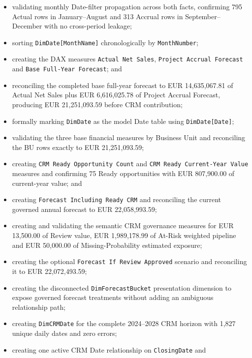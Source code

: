\documentclass[11pt,a4paper]{article}
\begin{document}
\begin{itemize}[leftmargin=7mm,itemsep=3pt]
    \texttt{DimDate[Date]} to \texttt{Fact\_ActualSales[MonthStart]} and
    \texttt{Fact\_ProjectAccrual[ForecastMonth]}; and
    \item validating monthly Date-filter propagation across both facts, confirming
    795 Actual rows in January--August and 313 Accrual rows in
    September--December with no cross-period leakage;
    \item sorting \texttt{DimDate[MonthName]} chronologically by
    \texttt{MonthNumber};
    \item creating the DAX measures \texttt{Actual Net Sales},
    \texttt{Project Accrual Forecast} and \texttt{Base Full-Year Forecast}; and
    \item reconciling the completed base full-year forecast to
    EUR 14,635,067.81 of Actual Net Sales plus EUR 6,616,025.78 of Project
    Accrual Forecast, producing EUR 21,251,093.59 before CRM contribution;
    \item formally marking \texttt{DimDate} as the model Date table using
    \texttt{DimDate[Date]};
    \item validating the three base financial measures by Business Unit and
    reconciling the BU rows exactly to EUR 21,251,093.59;
    \item creating \texttt{CRM Ready Opportunity Count} and
    \texttt{CRM Ready Current-Year Value} measures and confirming 75 Ready
    opportunities with EUR 807,900.00 of current-year value; and
    \item creating \texttt{Forecast Including Ready CRM} and reconciling the
    current governed annual forecast to EUR 22,058,993.59;
    \item creating and validating the semantic CRM governance measures for
    EUR 13,500.00 of Review value, EUR 1,989,178.99 of At-Risk weighted pipeline
    and EUR 50,000.00 of Missing-Probability estimated exposure;
    \item creating the optional \texttt{Forecast If Review Approved} scenario and
    reconciling it to EUR 22,072,493.59;
    \item creating the disconnected \texttt{DimForecastBucket} presentation
    dimension to expose governed forecast treatments without adding an ambiguous
    relationship path;
    \item creating \texttt{DimCRMDate} for the complete 2024--2028 CRM horizon
    with 1,827 unique daily dates and zero errors;
    \item creating one active CRM Date relationship on \texttt{ClosingDate} and

\end{itemize}
\end{document}
